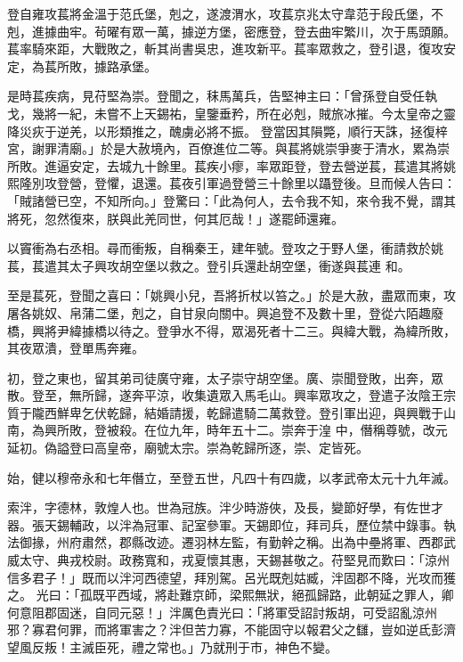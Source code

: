 \begin{pinyinscope}
 登自雍攻萇將金溫于范氏堡，剋之，遂渡渭水，攻萇京兆太守韋范于段氏堡，不剋，進據曲牢。茍曜有眾一萬，據逆方堡，密應登，登去曲牢繁川，次于馬頭願。萇率騎來距，大戰敗之，斬其尚書吳忠，進攻新平。萇率眾救之，登引退，復攻安定，為萇所敗，據路承堡。



 是時萇疾病，見苻堅為崇。登聞之，秣馬萬兵，告堅神主曰：「曾孫登自受任執戈，幾將一紀，未嘗不上天錫祐，皇鑒垂矜，所在必剋，賊旅冰摧。今太皇帝之靈降災疢于逆羌，以形類推之，醜虜必將不振。
 登當因其隕斃，順行天誅，拯復梓宮，謝罪清廟。」於是大赦境內，百僚進位二等。與萇將姚崇爭麥于清水，累為崇所敗。進逼安定，去城九十餘里。萇疾小瘳，率眾距登，登去營逆萇，萇遣其將姚熙隆別攻登營，登懼，退還。萇夜引軍過登營三十餘里以躡登後。旦而候人告曰：「賊諸營已空，不知所向。」登驚曰：「此為何人，去令我不知，來令我不覺，謂其將死，忽然復來，朕與此羌同世，何其厄哉！」遂罷師還雍。



 以竇衝為右丞相。尋而衝叛，自稱秦王，建年號。登攻之于野人堡，衝請救於姚萇，萇遣其太子興攻胡空堡以救之。登引兵還赴胡空堡，衝遂與萇連
 和。



 至是萇死，登聞之喜曰：「姚興小兒，吾將折杖以笞之。」於是大赦，盡眾而東，攻屠各姚奴、帛蒲二堡，剋之，自甘泉向關中。興追登不及數十里，登從六陌趣廢橋，興將尹緯據橋以待之。登爭水不得，眾渴死者十二三。與緯大戰，為緯所敗，其夜眾潰，登單馬奔雍。



 初，登之東也，留其弟司徒廣守雍，太子崇守胡空堡。廣、崇聞登敗，出奔，眾散。登至，無所歸，遂奔平涼，收集遺眾入馬毛山。興率眾攻之，登遣子汝陰王宗質于隴西鮮卑乞伏乾歸，結婚請援，乾歸遣騎二萬救登。登引軍出迎，與興戰于山南，為興所敗，登被殺。在位九年，時年五十二。崇奔于湟
 中，僭稱尊號，改元延初。偽謚登曰高皇帝，廟號太宗。崇為乾歸所逐，崇、定皆死。



 始，健以穆帝永和七年僭立，至登五世，凡四十有四歲，以孝武帝太元十九年滅。



 索泮，字德林，敦煌人也。世為冠族。泮少時游俠，及長，變節好學，有佐世才器。張天錫輔政，以泮為冠軍、記室參軍。天錫即位，拜司兵，歷位禁中錄事。執法御掾，州府肅然，郡縣改迹。遷羽林左監，有勤幹之稱。出為中壘將軍、西郡武威太守、典戎校尉。政務寬和，戎夏懷其惠，天錫甚敬之。苻堅見而歎曰：「涼州信多君子！」既而以泮河西德望，拜別駕。呂光既剋姑臧，泮固郡不降，光攻而獲之。
 光曰：「孤既平西域，將赴難京師，梁熙無狀，絕孤歸路，此朝延之罪人，卿何意阻郡固迷，自同元惡！」泮厲色責光曰：「將軍受詔討叛胡，可受詔亂涼州邪？寡君何罪，而將軍害之？泮但苦力寡，不能固守以報君父之讎，豈如逆氐彭濟望風反叛！主滅臣死，禮之常也。」乃就刑于市，神色不變。




\end{pinyinscope}
